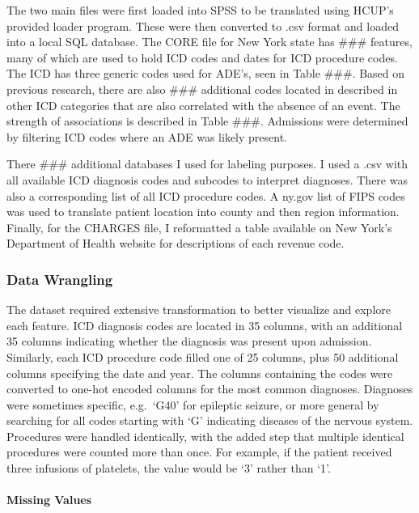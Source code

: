 \documentclass[preprint, 3p,
authoryear]{elsarticle} %
\begin{document}
The two main files were first loaded into SPSS to be translated using
HCUP's provided loader program. These were then converted to .csv format
and loaded into a local SQL database. The CORE file for New York state
has \#\#\# features, many of which are used to hold ICD codes and dates
for ICD procedure codes. The ICD has three generic codes used for ADE's,
seen in Table \#\#\#. Based on previous research, there are also \#\#\#
additional codes located in described in other ICD categories that are
also correlated with the absence of an event. The strength of
associations is described in Table \#\#\#. Admissions were determined by
filtering ICD codes where an ADE was likely present.

There \#\#\# additional databases I used for labeling purposes. I used a
.csv with all available ICD diagnosis codes and subcodes to interpret
diagnoses. There was also a corresponding list of all ICD procedure
codes. A ny.gov list of FIPS codes was used to translate patient
location into county and then region information. Finally, for the
CHARGES file, I reformatted a table available on New York's Department
of Health website for descriptions of each revenue code.

\hypertarget{data-wrangling}{%
\subsubsection{Data Wrangling}\label{data-wrangling}}

The dataset required extensive transformation to better visualize and
explore each feature. ICD diagnosis codes are located in 35 columns,
with an additional 35 columns indicating whether the diagnosis was
present upon admission. Similarly, each ICD procedure code filled one of
25 columns, plus 50 additional columns specifying the date and year. The
columns containing the codes were converted to one-hot encoded columns
for the most common diagnoses. Diagnoses were sometimes specific,
e.g.~`G40' for epileptic seizure, or more general by searching for all
codes starting with `G' indicating diseases of the nervous system.
Procedures were handled identically, with the added step that multiple
identical procedures were counted more than once. For example, if the
patient received three infusions of platelets, the value would be `3'
rather than `1'.

\hypertarget{missing-values}{%
\paragraph{Missing Values}\label{missing-values}}
\end{document}
